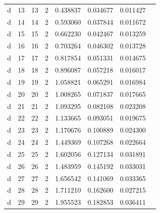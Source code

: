 \begin{table}[t]
\begin{tabular}{lrrrrrrr}
d & 13 & 13 & 2 & 0.438837 & 0.034677 & 0.011427 \\
d & 14 & 14 & 2 & 0.593060 & 0.037844 & 0.011672 \\
d & 15 & 15 & 2 & 0.662230 & 0.042467 & 0.013259 \\
d & 16 & 16 & 2 & 0.703264 & 0.046302 & 0.013728 \\
d & 17 & 17 & 2 & 0.817854 & 0.051331 & 0.014675 \\
d & 18 & 18 & 2 & 0.896087 & 0.057218 & 0.016017 \\
d & 19 & 19 & 2 & 1.058821 & 0.065291 & 0.016984 \\
d & 20 & 20 & 2 & 1.008265 & 0.071837 & 0.017665 \\
d & 21 & 21 & 2 & 1.093295 & 0.082108 & 0.023208 \\
d & 22 & 22 & 2 & 1.133665 & 0.093051 & 0.019675 \\
d & 23 & 23 & 2 & 1.170676 & 0.100889 & 0.024300 \\
d & 24 & 24 & 2 & 1.449369 & 0.107268 & 0.022664 \\
d & 25 & 25 & 2 & 1.602056 & 0.127134 & 0.031891 \\
d & 26 & 26 & 2 & 1.483959 & 0.145192 & 0.033031 \\
d & 27 & 27 & 2 & 1.656542 & 0.141069 & 0.033365 \\
d & 28 & 28 & 2 & 1.711210 & 0.162600 & 0.027215 \\
d & 29 & 29 & 2 & 1.955523 & 0.182853 & 0.036411 \\
\bottomrule
\end{tabular}
\end{table}
